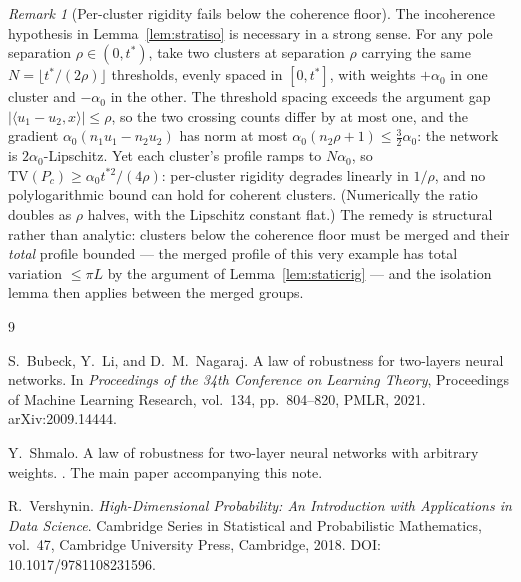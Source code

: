 \documentclass[11pt,reqno]{amsart}
\theoremstyle{plain}
\theoremstyle{definition}
\theoremstyle{remark}
\newtheorem{remark}[theorem]{Remark}
\newcommand{\inn}[2]{\langle #1,#2\rangle}
\begin{document}
\begin{remark}[Per-cluster rigidity fails below the coherence floor]\label{rem:rigidfail}
The incoherence hypothesis in Lemma~\ref{lem:stratiso} is necessary in a strong sense. For any pole separation $\rho\in(0,t^\ast)$, take two clusters at separation $\rho$ carrying the same $N=\lfloor t^\ast/(2\rho)\rfloor$ thresholds, evenly spaced in $[0,t^\ast]$, with weights $+\alpha_0$ in one cluster and $-\alpha_0$ in the other. The threshold spacing exceeds the argument gap $|\inn{u_1-u_2}x|\le\rho$, so the two crossing counts differ by at most one, and the gradient $\alpha_0(n_1u_1-n_2u_2)$ has norm at most $\alpha_0(n_2\rho+1)\le\tfrac32\alpha_0$: the network is $2\alpha_0$-Lipschitz. Yet each cluster's profile ramps to $N\alpha_0$, so $\mathrm{TV}(P_c)\ge\alpha_0t^{\ast2}/(4\rho)$: per-cluster rigidity degrades linearly in $1/\rho$, and no polylogarithmic bound can hold for coherent clusters. (Numerically the ratio doubles as $\rho$ halves, with the Lipschitz constant flat.) The remedy is structural rather than analytic: clusters below the coherence floor must be merged and their \emph{total} profile bounded --- the merged profile of this very example has total variation $\le\pi L$ by the argument of Lemma~\ref{lem:staticrig} --- and the isolation lemma then applies between the merged groups.
\end{remark}

\begin{thebibliography}{9}

S.~Bubeck, Y.~Li, and D.~M.~Nagaraj.
\newblock A law of robustness for two-layers neural networks.
\newblock In \emph{Proceedings of the 34th Conference on Learning Theory}, Proceedings of Machine Learning Research, vol.~134, pp.~804--820, PMLR, 2021. arXiv:2009.14444.

Y.~Shmalo.
\newblock A law of robustness for two-layer neural networks with arbitrary weights.
. The main paper accompanying this note.

R.~Vershynin.
\newblock \emph{High-Dimensional Probability: An Introduction with Applications in Data Science}.
\newblock Cambridge Series in Statistical and Probabilistic Mathematics, vol.~47, Cambridge University Press, Cambridge, 2018. DOI: 10.1017/9781108231596.

\end{thebibliography}
\end{document}
